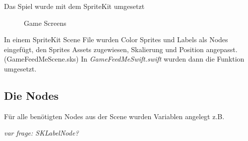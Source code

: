 Das Spiel wurde mit dem SpriteKit umgesetzt
\begin{figure}[H]
	\centering
	\caption{Game Screens}
	\label{Game Screens}
\end{figure}


In einem SpriteKit Scene File wurden Color Sprites und Labels als Nodes eingefügt, den Sprites Assets zugewiesen, Skalierung und Position angepasst. (GameFeedMeScene.sks)
In \textit{GameFeedMeSwift.swift} wurden dann die Funktion umgesetzt.

\subsection{Die Nodes}
Für alle benötigten Nodes aus der Scene wurden Variablen angelegt z.B.

		\textit{var frage: SKLabelNode?}

